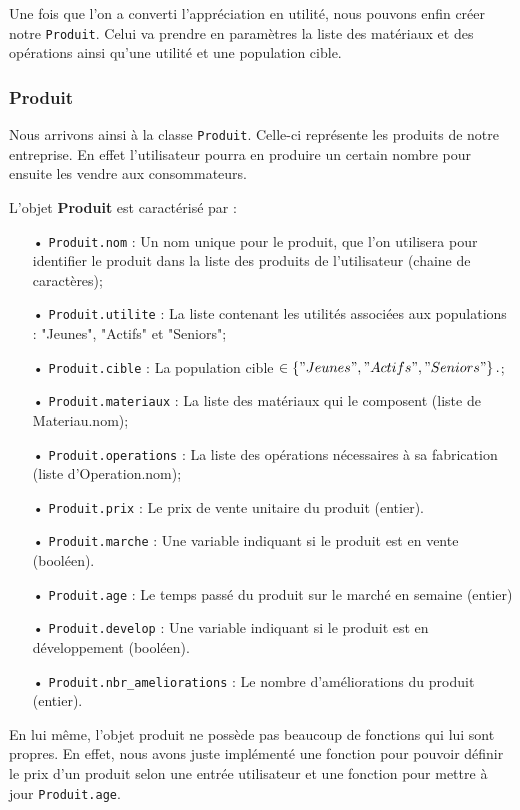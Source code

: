 \noindent
Une fois que l'on a converti l'appréciation en utilité, nous pouvons enfin créer notre \texttt{Produit}. Celui va prendre en paramètres la liste des matériaux et des opérations ainsi qu'une utilité et une population cible.  


\subsubsection{Produit}

Nous arrivons ainsi à la classe \texttt{Produit}. Celle-ci représente les produits de notre entreprise. En effet l'utilisateur pourra en produire un certain nombre pour ensuite les vendre aux consommateurs. 

\noindent
	L'objet \textbf{Produit} est caractérisé par :
	\begin{enumerate}
	\item[•] \texttt{Produit.nom} : Un nom unique pour le produit, que l'on utilisera pour identifier le produit dans la liste des produits de l'utilisateur (chaine de caractères);
	\item[•] \texttt{Produit.utilite} : La liste contenant les utilités associées aux populations : "Jeunes", "Actifs" et "Seniors";
	\item[•] \texttt{Produit.cible} : La population cible $\in \left\{ "Jeunes", "Actifs", "Seniors"\right\}.$;
	\item[•] \texttt{Produit.materiaux} : La liste des matériaux qui le composent (liste de Materiau.nom);
	\item[•] \texttt{Produit.operations} : La liste des opérations nécessaires à sa fabrication (liste d'Operation.nom);
	\item[•] \texttt{Produit.prix} : Le prix de vente unitaire du produit (entier).
	\item[•] \texttt{Produit.marche} : Une variable indiquant si le produit est en vente (booléen). 
	\item[•] \texttt{Produit.age} : Le temps passé du produit sur le marché en semaine (entier)  
	\item[•] \texttt{Produit.develop} : Une variable indiquant si le produit est en développement (booléen).
	\item[•] \texttt{Produit.nbr\_ameliorations} : Le nombre d'améliorations du produit (entier). 
	\end{enumerate}
	
	En lui même, l'objet produit ne possède pas beaucoup de fonctions qui lui sont propres. En effet, nous avons juste implémenté une fonction pour pouvoir définir le prix d'un produit selon une entrée utilisateur et une fonction pour mettre à jour \texttt{Produit.age}. 
	
